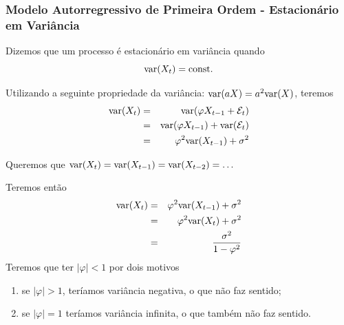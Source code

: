 \begin{frame}[allowframebreaks]
  \frametitle{Modelo Autorregressivo de Primeira Ordem - Estacionário em Variância}
  Dizemos que um processo é estacionário em variância quando
  \begin{equation}
  \textmd{var}(X_t) = \textmd{const.}
  \end{equation}
  
  Utilizando a seguinte propriedade da variância: 
  $\textmd{var}(aX) = a^2 \textmd{var}(X)$, teremos
  \begin{eqnarray}
  \textmd{var}(X_t) &=& \textmd{var}(\varphi X_{t-1} + \mathcal{E}_t) \nonumber \\
                    &=& \textmd{var}(\varphi X_{t-1}) +  \textmd{var}(\mathcal{E}_t) \nonumber \\
                    &=& \varphi^2 \textmd{var}(X_{t-1}) + \sigma^2
  \end{eqnarray}
  
  Queremos que $\textmd{var}(X_{t}) = \textmd{var}(X_{t-1}) = \textmd{var}(X_{t-2}) = \ldots$

  Teremos então
  \begin{eqnarray}
  \textmd{var}(X_t) &=& \varphi^2 \textmd{var}(X_{t-1}) + \sigma^2 \nonumber \\
                    &=& \varphi^2 \textmd{var}(X_{t}) + \sigma^2 \nonumber \\
                    &=& \frac{\sigma^2}{1 - \varphi^2}
  \end{eqnarray}
  Teremos que ter $\vert \varphi \vert < 1$ por dois motivos
  \begin{enumerate}
        \item se $\vert \varphi \vert > 1$, teríamos variância negativa, o que não
        faz sentido;
        \item se $\vert \varphi \vert = 1$ teríamos variância infinita, o que também
        não faz sentido.
\end{enumerate}
\end{frame}

